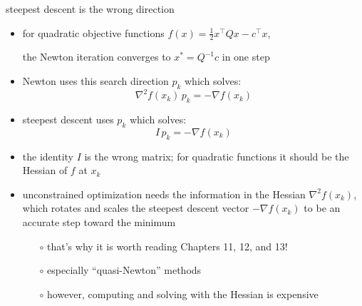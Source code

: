 \documentclass[10pt,hyperref]{beamer}
\newcommand{\grad}{\nabla}
\begin{document}
\begin{frame}{steepest descent is the wrong direction}

\begin{itemize}
\item for quadratic objective functions $f(x)=\frac{1}{2} x^\top Q x - c^\top x$,

\centerline{\alert{the Newton iteration converges to $x^*=Q^{-1}c$ in one step}}

\bigskip
\item Newton uses this search direction $p_k$ which solves:
    $$\grad^2 f(x_k)\, p_k = - \grad f(x_k)$$
\item steepest descent uses $p_k$ which solves:
    $$I\, p_k = - \grad f(x_k)$$
\item the identity $I$ is the wrong matrix; for quadratic functions it should be the Hessian of $f$ at $x_k$

\bigskip
\item unconstrained optimization \alert{needs the information in the Hessian $\grad^2 f(x_k)$}, which rotates and scales the steepest descent vector $-\grad f(x_k)$ to be an accurate step toward the minimum
    \begin{itemize}
    \item[$\circ$] that's why it is worth reading Chapters 11, 12, and 13!
    \item[$\circ$] especially ``quasi-Newton'' methods
    \item[$\circ$] however, computing and solving with the Hessian is expensive
    \end{itemize}
\end{itemize}
\end{frame}
\end{document}
